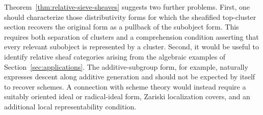 \documentclass[12pt,oneside,reqno]{amsart}
\theoremstyle{definition}
\theoremstyle{remark}
\begin{document}
Theorem~\ref{thm:relative-sieve-sheaves} suggests two further problems.
First, one should characterize those distributivity forms for which the
sheafified top-cluster section recovers the original form as a pullback
of the subobject form.  This requires both separation of clusters and a
comprehension condition asserting that every relevant subobject is
represented by a cluster.  Second, it would be useful to identify
relative sheaf categories arising from the algebraic examples of
Section~\ref{sec:applications}.  The additive-subgroup form, for
example, naturally expresses descent along additive generation and
should not be expected by itself to recover schemes.  A connection with
scheme theory would instead require a suitably oriented ideal or
radical-ideal form, Zariski localization covers, and an additional local
representability condition.
\end{document}
